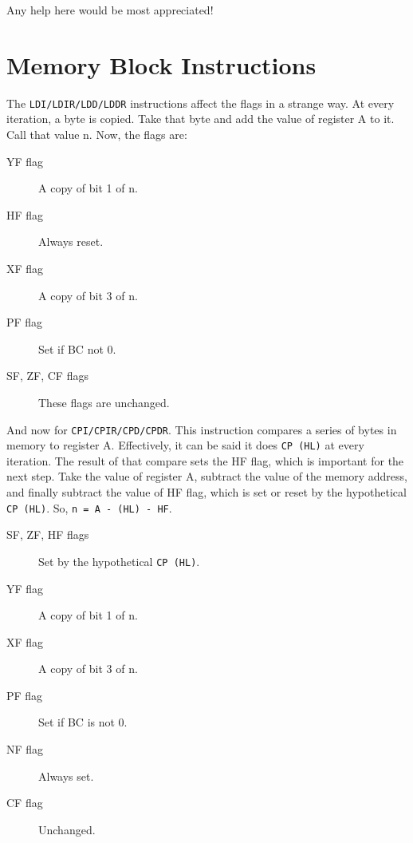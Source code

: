 \documentclass[oneside,a4paper]{book}
\begin{document}
Any help here would be most appreciated!


\section{Memory Block Instructions \cite{mrison}}
\label{block_mem}

The {\tt LDI/LDIR/LDD/LDDR} instructions affect the flags in a strange way. At every iteration, a byte is copied. Take that byte and add the value of register A to it. Call that value n. Now, the flags are:

\begin{description}
 
	\item[YF flag]
	A copy of bit 1 of n.

	\item[HF flag]
	Always reset.

	\item[XF flag]
	A copy of bit 3 of n.

	\item[PF flag]
	Set if BC not 0.

	\item[SF, ZF, CF flags]
	These flags are unchanged.

\end{description}

And now for {\tt CPI/CPIR/CPD/CPDR}. This instruction compares a series of bytes in memory to register A. Effectively, it can be said it does {\tt CP (HL)} at every iteration. The result of that compare sets the HF flag, which is important for the next step. Take the value of register A, subtract the value of the memory address, and finally subtract the value of HF flag, which is set or reset by the hypothetical {\tt CP (HL)}. So, {\tt n = A - (HL) - HF}.

\begin{description}

	\item[SF, ZF, HF flags]
	Set by the hypothetical {\tt CP (HL)}.

	\item[YF flag]
	A copy of bit 1 of n.

	\item[XF flag]
	A copy of bit 3 of n.

	\item[PF flag]
	Set if BC is not 0.

	\item[NF flag]
	Always set.

	\item[CF flag]
	Unchanged.

\end{description}
\end{document}
